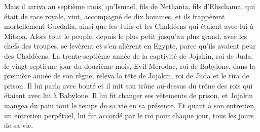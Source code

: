 \begin{multicols}{2}
Mais il arriva au septième mois, qu'Ismaël, fils de Nethania, fils d'Elischama, qui était de race royale, vint, accompagné de dix hommes, et ils frappèrent mortellement Guedalia, ainsi que les Juifs et les Chaldéens qui étaient avec lui à Mitspa.
Alors tout le peuple, depuis le plus petit jusqu'au plus grand, avec les chefs des troupes, se levèrent et s'en allèrent en Egypte, parce qu'ils avaient peur des Chaldéens.
La trente-septième année de la captivité de Jojakin, roi de Juda, le vingt-septième jour du douzième mois, Evil-Merodac, roi de Babylone, dans la première année de son règne, releva la tête de Jojakin, roi de Juda et le tira de prison.
Il lui parla avec bonté et il mit son trône au-dessus du trône des rois qui étaient avec lui à Babylone.
Il lui fit changer ses vêtements de prison, et Jojakin mangea du pain tout le temps de sa vie en sa présence.
Et quant à son entretien, un entretien perpétuel, lui fut accordé par le roi pour chaque jour, tous les jours de sa vie.
\PPE{}
\end{multicols}
